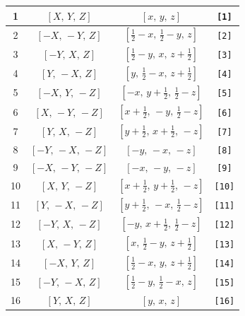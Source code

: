 \documentclass[fleqn,8pt]{jsarticle}
\begin{document}
\begin{longtable}{cccc}
1 & $\left[ X,\, Y,\, Z \right]$ & $\left[ x,\, y,\, z \right]$ & {\tt [1]} \\ \hline
2 & $\left[ - X,\, - Y,\, Z \right]$ & $\left[ \frac{1}{2} - x,\, \frac{1}{2} - y,\, z \right]$ & {\tt [2]} \\ \hline
3 & $\left[ - Y,\, X,\, Z \right]$ & $\left[ \frac{1}{2} - y,\, x,\, z + \frac{1}{2} \right]$ & {\tt [3]} \\ \hline
4 & $\left[ Y,\, - X,\, Z \right]$ & $\left[ y,\, \frac{1}{2} - x,\, z + \frac{1}{2} \right]$ & {\tt [4]} \\ \hline
5 & $\left[ - X,\, Y,\, - Z \right]$ & $\left[ - x,\, y + \frac{1}{2},\, \frac{1}{2} - z \right]$ & {\tt [5]} \\ \hline
6 & $\left[ X,\, - Y,\, - Z \right]$ & $\left[ x + \frac{1}{2},\, - y,\, \frac{1}{2} - z \right]$ & {\tt [6]} \\ \hline
7 & $\left[ Y,\, X,\, - Z \right]$ & $\left[ y + \frac{1}{2},\, x + \frac{1}{2},\, - z \right]$ & {\tt [7]} \\ \hline
8 & $\left[ - Y,\, - X,\, - Z \right]$ & $\left[ - y,\, - x,\, - z \right]$ & {\tt [8]} \\ \hline
9 & $\left[ - X,\, - Y,\, - Z \right]$ & $\left[ - x,\, - y,\, - z \right]$ & {\tt [9]} \\ \hline
10 & $\left[ X,\, Y,\, - Z \right]$ & $\left[ x + \frac{1}{2},\, y + \frac{1}{2},\, - z \right]$ & {\tt [10]} \\ \hline
11 & $\left[ Y,\, - X,\, - Z \right]$ & $\left[ y + \frac{1}{2},\, - x,\, \frac{1}{2} - z \right]$ & {\tt [11]} \\ \hline
12 & $\left[ - Y,\, X,\, - Z \right]$ & $\left[ - y,\, x + \frac{1}{2},\, \frac{1}{2} - z \right]$ & {\tt [12]} \\ \hline
13 & $\left[ X,\, - Y,\, Z \right]$ & $\left[ x,\, \frac{1}{2} - y,\, z + \frac{1}{2} \right]$ & {\tt [13]} \\ \hline
14 & $\left[ - X,\, Y,\, Z \right]$ & $\left[ \frac{1}{2} - x,\, y,\, z + \frac{1}{2} \right]$ & {\tt [14]} \\ \hline
15 & $\left[ - Y,\, - X,\, Z \right]$ & $\left[ \frac{1}{2} - y,\, \frac{1}{2} - x,\, z \right]$ & {\tt [15]} \\ \hline
16 & $\left[ Y,\, X,\, Z \right]$ & $\left[ y,\, x,\, z \right]$ & {\tt [16]} \\
\end{longtable}
\end{document}
